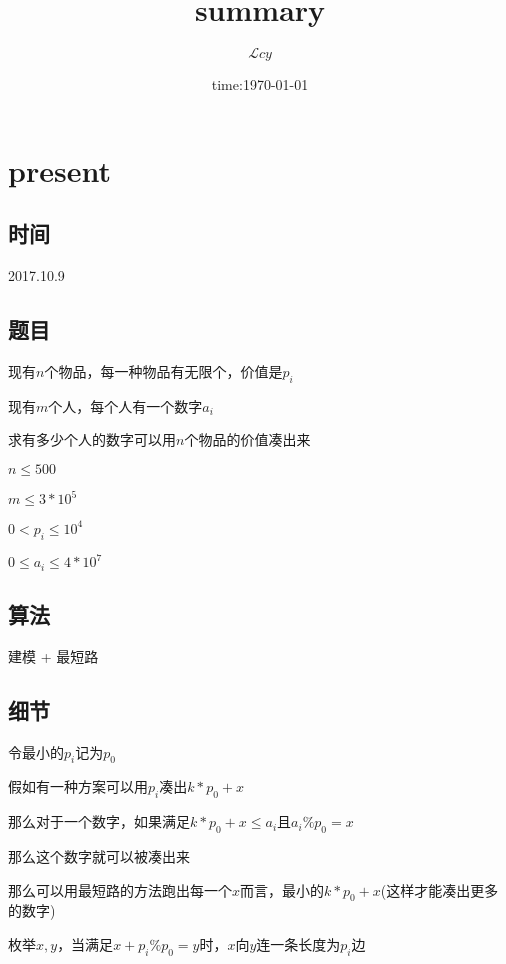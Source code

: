 \documentclass[a4paper]{article}
\date{time:\today}
\title{summary}
\author{{$\mathcal Lcy$}}
\newcommand{\song}{\CJKfamily{song}}
\begin{document}
	
	\maketitle
	
	\song
	
	\tableofcontents
	
	\section{present}
		
	\subsection{时间}
		
		2017.10.9
		
	\subsection{题目}
		
		现有$n$个物品，每一种物品有无限个，价值是$p_i$
		
		现有$m$个人，每个人有一个数字$a_i$
		
		求有多少个人的数字可以用$n$个物品的价值凑出来
		
		$n \leq 500$
		
		$m \leq 3*10^5$
		
		$0 < p_i \leq 10^4$
		
		$0 \leq a_i \leq 4 * 10^7$
		
	\subsection{算法}
		
		建模 + 最短路
		
	\subsection{细节}
		
		令最小的$p_i$记为$p_0$
		
		假如有一种方案可以用$p_i$凑出$k * p_0 + x$
		
		那么对于一个数字，如果满足$k * p_0 + x \leq a_i$且$a_i \% p_0 = x$
		
		那么这个数字就可以被凑出来
		
		那么可以用最短路的方法跑出每一个$x$而言，最小的$k * p_0 + x$(这样才能凑出更多的数字)
		
		枚举$x,y$，当满足$x + p_i \% p_0 = y$时，$x$向$y$连一条长度为$p_i$边
		
\end{document}
